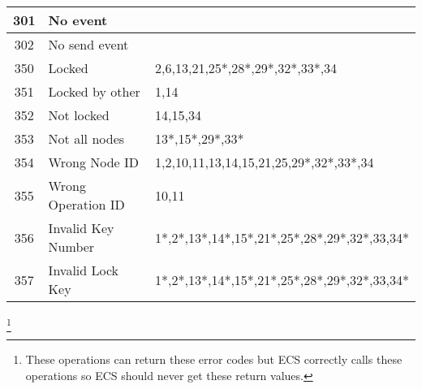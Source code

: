\begin{tabular} {|c|l|l|}
      301 & No event &  \\ \hline 
      302 & No send event &  \\ \hline 
      350 & Locked & 2,6,13,21,25*,28*,29*,32*,33*,34 \\ \hline 
      351 & Locked by other & 1,14 \\ \hline 
      352 & Not locked & 14,15,34 \\ \hline 
      353 & Not all nodes & 13*,15*,29*,33* \\ \hline 
      354 & Wrong Node ID & 1,2,10,11,13,14,15,21,25,29*,32*,33*,34 \\ \hline
      355 & Wrong Operation ID & 10,11 \\ \hline
      356 & Invalid Key Number & 1*,2*,13*,14*,15*,21*,25*,28*,29*,32*,33,34* \\ \hline 
      357 & Invalid Lock Key & 1*,2*,13*,14*,15*,21*,25*,28*,29*,32*,33,34* \\ \hline 
    \end{tabular}
\renewcommand{\thefootnote}{\fnsymbol{footnote}}
\footnote[1]{These operations can return these error codes but ECS
correctly calls these operations so ECS should never get these return
values.}
\renewcommand{\thefootnote}{\arabic{footnote}}
\normalsize

\newpage






